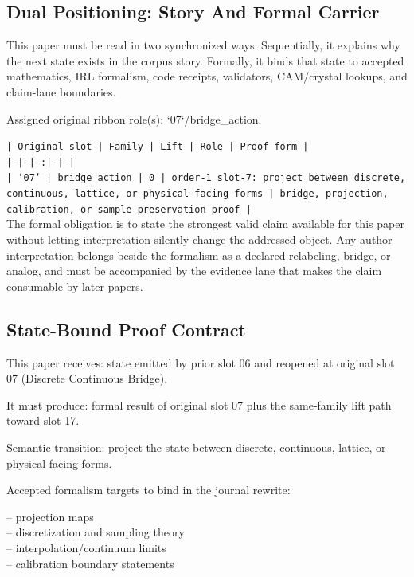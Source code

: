 \documentclass[11pt]{article}
\begin{document}
\subsection*{Dual Positioning: Story And Formal Carrier}

This paper must be read in two synchronized ways. Sequentially, it explains why
the next state exists in the corpus story. Formally, it binds that state to
accepted mathematics, IRL formalism, code receipts, validators, CAM/crystal
lookups, and claim-lane boundaries.

Assigned original ribbon role(s): `07`/bridge\_action.

\noindent\texttt{| Original slot | Family | Lift | Role | Proof form |}\\
\noindent\texttt{|---|---|---:|---|---|}\\
\noindent\texttt{| `07` | bridge\_action | 0 | order-1 slot-7: project between discrete, continuous, lattice, or physical-facing forms | bridge, projection, calibration, or sample-preservation proof |}\\

The formal obligation is to state the strongest valid claim available for this
paper without letting interpretation silently change the addressed object. Any
author interpretation belongs beside the formalism as a declared relabeling,
bridge, or analog, and must be accompanied by the evidence lane that makes the
claim consumable by later papers.

\subsection*{State-Bound Proof Contract}

This paper receives: state emitted by prior slot 06 and reopened at original slot 07 (Discrete Continuous Bridge).

It must produce: formal result of original slot 07 plus the same-family lift path toward slot 17.

Semantic transition: project the state between discrete, continuous, lattice, or physical-facing forms.

Accepted formalism targets to bind in the journal rewrite:

\noindent{}-- projection maps\\
\noindent{}-- discretization and sampling theory\\
\noindent{}-- interpolation/continuum limits\\
\noindent{}-- calibration boundary statements\\
\end{document}

